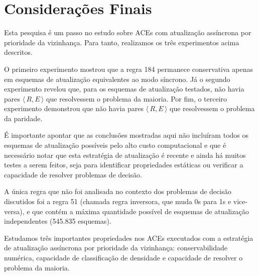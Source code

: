 \documentclass[a4paper,12pt]{ltxdoc}
\newcommand\tab[1][1cm]{\hspace*{#1}}
\begin{document}
\section{Considerações Finais} \label{comentarios-finais}

Esta pesquisa é um passo no estudo sobre ACEs com atualização assíncrona por prioridade da vizinhança. Para tanto, realizamos os três experimentos acima descritos.

\tab O primeiro experimento mostrou que a regra 184 permanece conservativa apenas em esquemas de atualização equivalentes ao modo síncrono. Já o segundo experimento revelou que, para os esquemas de atualização testados, não havia pares $\langle\,R,E\,\rangle$ que resolvessem o problema da maioria. Por fim, o terceiro experimento demonstrou que não havia pares $\langle\,R,E\,\rangle$ que resolvessem o problema da paridade.

\tab É importante apontar que as conclusões mostradas aqui não incluíram todos os esquemas de atualização possíveis pelo alto custo computacional e que é necessário notar que esta estratégia de atualização é recente e ainda há muitos testes a serem feitos, seja para identificar propriedades estáticas ou verificar a capacidade de resolver problemas de decisão.

\tab A única regra que não foi analisada no contexto dos problemas de decisão discutidos foi a regra 51 (chamada regra inversora, que muda 0s para 1s e vice-versa), e que contém a máxima quantidade possível de esquemas de atualização independentes (545.835 esquemas).

\tab Estudamos três importantes propriedades nos ACEs executados com a estratégia de atualização assíncrona por prioridade da vizinhança: conservabilidade numérica, capacidade de classificação de densidade e capacidade de resolver o problema da maioria. 




\end{document}
